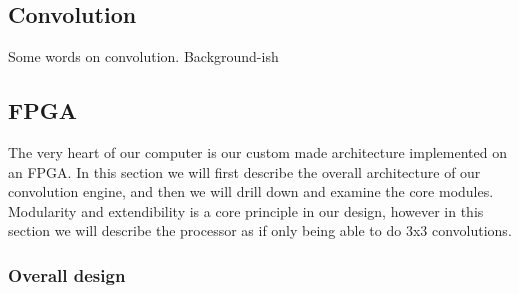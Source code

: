 \subsection{Convolution}
Some words on convolution. Background-ish

\subsection{FPGA}

The very heart of our computer is our custom made architecture implemented on an FPGA.
In this section we will first describe the overall architecture of our convolution engine, and then we will drill down and examine the core modules.
Modularity and extendibility is a core principle in our design, however in this section we will describe the processor as if only being able to do 3x3 convolutions.

\subsubsection{Overall design}


